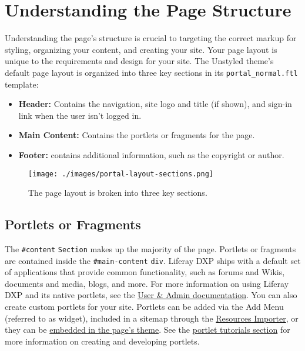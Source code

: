 \chapter{Understanding the Page
Structure}\label{understanding-the-page-structure}

Understanding the page's structure is crucial to targeting the correct
markup for styling, organizing your content, and creating your site.
Your page layout is unique to the requirements and design for your site.
The Unstyled theme's default page layout is organized into three key
sections in its \texttt{portal\_normal.ftl} template:

\begin{itemize}
\tightlist
\item
  \textbf{Header:} Contains the navigation, site logo and title (if
  shown), and sign-in link when the user isn't logged in.
\item
  \textbf{Main Content:} Contains the portlets or fragments for the
  page.
\item
  \textbf{Footer:} contains additional information, such as the
  copyright or author.
\end{itemize}

\begin{figure}
\centering
\texttt{[image: ./images/portal-layout-sections.png]}
\caption{The page layout is broken into three key sections.}
\end{figure}

\section{Portlets or Fragments}\label{portlets-or-fragments}

The \texttt{\#content} \texttt{Section} makes up the majority of the
page. Portlets or fragments are contained inside the
\texttt{\#main-content} \texttt{div}. Liferay DXP ships with a default
set of applications that provide common functionality, such as forums
and Wikis, documents and media, blogs, and more. For more information on
using Liferay DXP and its native portlets, see the
\href{/documentation/user}{User \& Admin documentation}. You can also
create custom portlets for your site. Portlets can be added via the Add
Menu (referred to as widget), included in a sitemap through the
\href{/docs/7-2/frameworks/-/knowledge_base/f/importing-resources-with-a-theme}{Resources
Importer}, or they can be
\href{/docs/7-2/frameworks/-/knowledge_base/f/embedding-portlets-in-themes}{embedded
in the page's theme}. See the
\href{/docs/7-2/frameworks/-/knowledge_base/f/portlets}{portlet
tutorials section} for more information on creating and developing
portlets.

